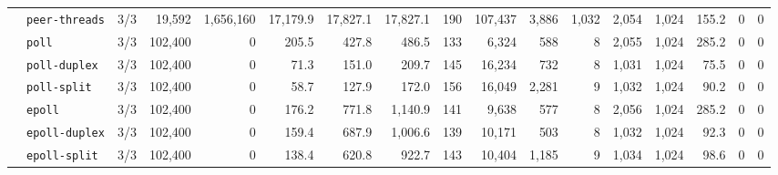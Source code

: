 \begin{longtable}{@{}llrrrrrrrrrrrrrrr@{}}
 & \texttt{peer-threads} & 3/3 & 19{,}592 & 1{,}656{,}160 & 17{,}179.9 & 17{,}827.1 & 17{,}827.1 & 190 & 107{,}437 & 3{,}886 & 1{,}032 & 2{,}054 & 1{,}024 & 155.2 & 0 & 0 \\
 & \texttt{poll} & 3/3 & 102{,}400 & 0 & 205.5 & 427.8 & 486.5 & 133 & 6{,}324 & 588 & 8 & 2{,}055 & 1{,}024 & 285.2 & 0 & 0 \\
 & \texttt{poll-duplex} & 3/3 & 102{,}400 & 0 & 71.3 & 151.0 & 209.7 & 145 & 16{,}234 & 732 & 8 & 1{,}031 & 1{,}024 & 75.5 & 0 & 0 \\
 & \texttt{poll-split} & 3/3 & 102{,}400 & 0 & 58.7 & 127.9 & 172.0 & 156 & 16{,}049 & 2{,}281 & 9 & 1{,}032 & 1{,}024 & 90.2 & 0 & 0 \\
 & \texttt{epoll} & 3/3 & 102{,}400 & 0 & 176.2 & 771.8 & 1{,}140.9 & 141 & 9{,}638 & 577 & 8 & 2{,}056 & 1{,}024 & 285.2 & 0 & 0 \\
 & \texttt{epoll-duplex} & 3/3 & 102{,}400 & 0 & 159.4 & 687.9 & 1{,}006.6 & 139 & 10{,}171 & 503 & 8 & 1{,}032 & 1{,}024 & 92.3 & 0 & 0 \\
 & \texttt{epoll-split} & 3/3 & 102{,}400 & 0 & 138.4 & 620.8 & 922.7 & 143 & 10{,}404 & 1{,}185 & 9 & 1{,}034 & 1{,}024 & 98.6 & 0 & 0 \\
\end{longtable}
